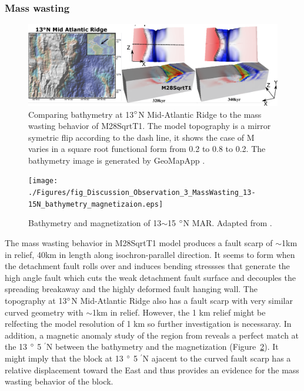\subsubsection{Mass wasting}

\begin{figure}[h]
 \centering
  \includegraphics[width=1.0\textwidth]{./Figures/fig_Discussion_Observation_1_13N_MAR_CutBack.eps}
 \caption[Comparing bathymetry at 13$\degree$N Mid-Atlantic Ridge to the mass wasting behavior of M28SqrtT1.]{Comparing bathymetry at 13$\degree$N Mid-Atlantic Ridge to the mass wasting behavior of M28SqrtT1. The model topography is a mirror symetric flip according to the dash line, it shows the case of M varies in a square root functional form from 0.2 to 0.8 to 0.2. The bathymetry image is generated by GeoMapApp \citep{Ryan2009}.}
 \label{fig_Discussion_Observation_1_13N_MAR_CutBack}
\end{figure}

\begin{figure}[h]
 \centering
  \texttt{[image: ./Figures/fig\_Discussion\_Observation\_3\_MassWasting\_13-15N\_bathymetry\_magnetizaion.eps]}
 \caption{Bathymetry and magnetization of 13$\sim$15 $\degree$N MAR. Adapted from \citep{Smith2008}.}
 \label{fig_Discussion_Observation_3_MassWasting_13-15N_bathymetry_magnetizaion}
\end{figure}

The mass wasting behavior in M28SqrtT1 model produces a fault scarp of $\sim$1km in relief, 40km in length along isochron-parallel direction. It seems to form when the detachment fault rolls over and induces bending stressses that generate the high angle fault which cuts the weak detachment fault surface and decouples the spreading breakaway and the highly deformed fault hanging wall. The topography at 13$\degree$N Mid-Atlantic Ridge also has a fault scarp with very similar curved geometry with $\sim$1km in relief. However, the 1 km relief might be relfecting the model resolution of 1 km so further investigation is necessaray. In addition, a magnetic anomaly study of the region from \citep{Smith2008} reveals a perfect match at the 13 $\degree$ 5 $^{\prime}$N between the bathymetry and the magnetization (Figure~\hyperref[fig_Discussion_Observation_3_MassWasting_13-15N_bathymetry_magnetizaion]{\ref{fig_Discussion_Observation_3_MassWasting_13-15N_bathymetry_magnetizaion}}). It might imply that the block at 13 $\degree$ 5 $^{\prime}$N ajacent to the curved fault scarp has a relative displacement toward the East and thus provides an evidence for the mass wasting behavior of the block.   
 
